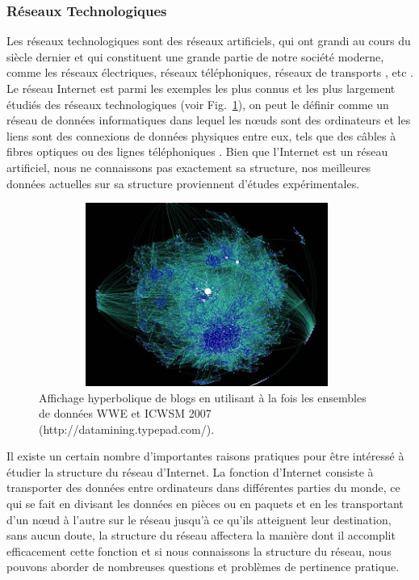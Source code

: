  \subsubsection{Réseaux Technologiques}
  Les réseaux technologiques sont des réseaux artificiels, qui ont grandi au cours du siècle dernier et qui constituent
  une grande partie de notre société moderne, comme les réseaux électriques, réseaux téléphoniques, réseaux de transports
  , etc \cite{Pi1965,Am-al2000,Do-al2007,Se-al2003}.
  Le réseau Internet est parmi les exemples les plus connus et les plus largement étudiés des réseaux technologiques 
  (voir Fig.~\ref{Internet}), on peut le définir comme un réseau de données informatiques dans lequel les nœuds 
  sont des ordinateurs et les liens sont des connexions de données physiques entre eux, tels que des câbles à fibres
  optiques ou des lignes téléphoniques \cite{F-al1999,BC2001}. Bien que l'Internet est un réseau 
  artificiel, nous ne connaissons pas exactement sa structure, nos meilleures données actuelles sur sa structure 
  proviennent d'études expérimentales.
  \begin{figure}[h!]
  	\centering
  	\includegraphics[width=11cm,height=6cm]{./figures/Internet3}
  	\caption{Affichage hyperbolique de blogs en utilisant à la fois les ensembles 
  	de données WWE et ICWSM 2007 (http://datamining.typepad.com/).}
  	\label{Internet}
  \end{figure}

  Il existe un certain nombre d'importantes raisons pratiques pour être intéressé à étudier la structure du réseau
  d'Internet. La fonction d'Internet consiste à transporter des données entre ordinateurs dans différentes parties du 
  monde, ce qui se fait en divisant les données en pièces ou en paquets et en les transportant d'un nœud à l'autre sur
  le réseau jusqu'à ce qu'ils atteignent leur destination, sans aucun doute, la structure du réseau affectera la manière
  dont il accomplit efficacement cette fonction et si nous connaissons la structure du réseau, nous pouvons aborder de
  nombreuses questions et problèmes de pertinence pratique.
  
